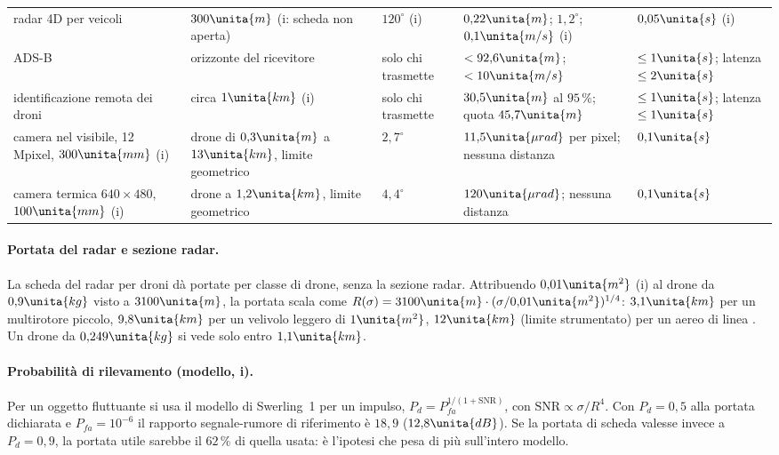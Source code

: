 \begin{table}[H]
\begin{tabularx}{\linewidth}{@{}>{\RaggedRight\arraybackslash}p{3.3cm}>{\RaggedRight\arraybackslash}p{3.0cm}>{\RaggedRight\arraybackslash}p{2.0cm}L>{\RaggedRight\arraybackslash}p{1.6cm}@{}}
radar 4D per veicoli & $300\unita{m}$ (i: scheda non aperta) & $120^\circ$ (i) & $0{,}22\unita{m}$; $1{,}2^\circ$; $0{,}1\unita{m/s}$ (i) & $0{,}05\unita{s}$ (i)\\
ADS-B \cite{cfr-91-227} & orizzonte del ricevitore & solo chi trasmette & $<92{,}6\unita{m}$; $<10\unita{m/s}$ & $\le1\unita{s}$; latenza $\le2\unita{s}$\\
identificazione remota dei droni \cite{cfr-89-310} & circa $1\unita{km}$ (i) & solo chi trasmette & $30{,}5\unita{m}$ al $95\,\%$; quota $45{,}7\unita{m}$ & $\le1\unita{s}$; latenza $\le1\unita{s}$\\
camera nel visibile, 12 Mpixel, $300\unita{mm}$ (i) & drone di $0{,}3\unita{m}$ a $13\unita{km}$, limite geometrico \cite{wiki-johnson} & $2{,}7^\circ$ & $11{,}5\unita{\mu rad}$ per pixel; nessuna distanza & $0{,}1\unita{s}$\\
camera termica $640\times480$, $100\unita{mm}$ (i) & drone a $1{,}2\unita{km}$, limite geometrico & $4{,}4^\circ$ & $120\unita{\mu rad}$; nessuna distanza & $0{,}1\unita{s}$\\
\bottomrule
\end{tabularx}
\end{table}

\paragraph{Portata del radar e sezione radar.} La scheda del radar per droni dà portate per classe di drone, senza la sezione radar. Attribuendo $0{,}01\unita{m^2}$ (i) al drone da $0{,}9\unita{kg}$ visto a $3100\unita{m}$, la portata scala come $R(\sigma)=3100\unita{m}\cdot(\sigma/0{,}01\unita{m^2})^{1/4}$: $3{,}1\unita{km}$ per un multirotore piccolo, $9{,}8\unita{km}$ per un velivolo leggero di $1\unita{m^2}$, $12\unita{km}$ (limite strumentato) per un aereo di linea . Un drone da $0{,}249\unita{kg}$ si vede solo entro $1{,}1\unita{km}$.

\paragraph{Probabilità di rilevamento (modello, i).} Per un oggetto fluttuante si usa il modello di Swerling~1 per un impulso, $P_d=P_{fa}^{1/(1+\mathrm{SNR})}$, con $\mathrm{SNR}\propto\sigma/R^4$. Con $P_d=0{,}5$ alla portata dichiarata e $P_{fa}=10^{-6}$ il rapporto segnale-rumore di riferimento è $18{,}9$ ($12{,}8\unita{dB}$). Se la portata di scheda valesse invece a $P_d=0{,}9$, la portata utile sarebbe il $62\,\%$ di quella usata: è l'ipotesi che pesa di più sull'intero modello.

